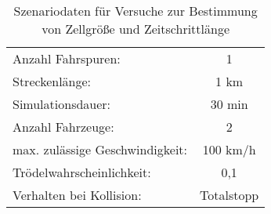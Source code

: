 \begin{table}[hptb]
\begin{center}
\setlength{\tabcolsep}{0.5em} %
{\renewcommand{\arraystretch}{1.2}%
\begin{tabular}{ l  c }
\hline 
\hspace{1em}Anzahl Fahrspuren:\hspace{1em} & \hspace{1em}1\hspace{1em} \\
\hspace{1em}Streckenlänge:\hspace{1em} & \hspace{1em}1 km\hspace{1em} \\
\hspace{1em}Simulationsdauer:\hspace{1em} & \hspace{1em}30 min\hspace{1em} \\
\hspace{1em}Anzahl Fahrzeuge:\hspace{1em} & \hspace{1em}2\hspace{1em} \\
\hspace{1em}max. zulässige Geschwindigkeit:\hspace{1em} & \hspace{1em}100 km/h\hspace{1em} \\
\hspace{1em}Trödelwahrscheinlichkeit:\hspace{1em} & \hspace{1em}0,1\hspace{1em} \\
\hspace{1em}Verhalten bei Kollision:\hspace{1em} & \hspace{1em}Totalstopp\hspace{1em} \\
\hline 
\end{tabular}
}
\caption{Szenariodaten für Versuche zur Bestimmung von Zellgröße und Zeitschrittlänge}
\label{tab:szenario-cell-timestep}
\end{center}
\end{table}

